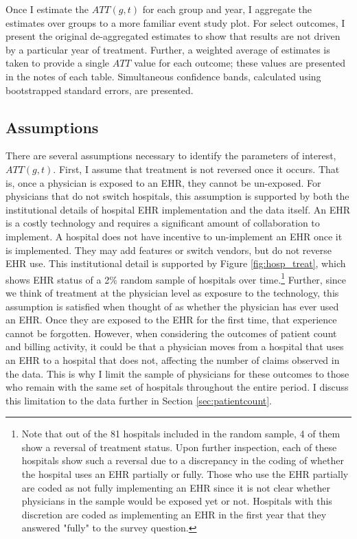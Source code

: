 \documentclass[12pt]{article}
\begin{document}
Once I estimate the $ATT(g,t)$ for each group and year, I aggregate the estimates over groups to a more familiar event study plot. For select outcomes, I present the original de-aggregated estimates to show that results are not driven by a particular year of treatment.  Further, a weighted average of estimates is taken to provide a single $ATT$ value for each outcome; these values are presented in the notes of each table. Simultaneous confidence bands, calculated using bootstrapped standard errors, are presented. 

\subsection{Assumptions}

There are several assumptions necessary to identify the parameters of interest, $ATT(g,t)$. First, I assume that treatment is not reversed once it occurs. That is, once a physician is exposed to an EHR, they cannot be un-exposed. For physicians that do not switch hospitals, this assumption is supported by both the institutional details of hospital EHR implementation and the data itself. An EHR is a costly technology and requires a significant amount of collaboration to implement. A hospital does not have incentive to un-implement an EHR once it is implemented. They may add features or switch vendors, but do not reverse EHR use. This institutional detail is supported by Figure \ref{fig:hosp_treat}, which shows EHR status of a 2\% random sample of hospitals over time.\footnote{Note that out of the 81 hospitals included in the random sample, 4 of them show a reversal of treatment status. Upon further inspection, each of these hospitals show such a reversal due to a discrepancy in the coding of whether the hospital uses an EHR partially or fully. Those who use the EHR partially are coded as not fully implementing an EHR since it is not clear whether physicians in the sample would be exposed yet or not. Hospitals with this discretion are coded as implementing an EHR in the first year that they answered "fully" to the survey question.} Further, since we think of treatment at the physician level as exposure to the technology, this assumption is satisfied when thought of as whether the physician has ever used an EHR. Once they are exposed to the EHR for the first time, that experience cannot be forgotten. However, when considering the outcomes of patient count and billing activity, it could be that a physician moves from a hospital that uses an EHR to a hospital that does not, affecting the number of claims observed in the data. This is why I limit the sample of physicians for these outcomes to those who remain with the same set of hospitals throughout the entire period. I discuss this limitation to the data further in Section \ref{sec:patientcount}.
\end{document}
